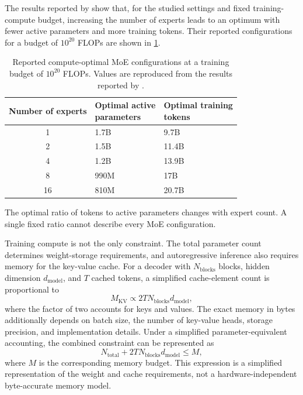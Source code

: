 The results reported by \textcite{Ludziejewski2025JointMoE} show that, for
the studied settings and fixed training-compute budget, increasing the
number of experts leads to an optimum with fewer active parameters and more
training tokens. Their reported configurations for a budget of
\(10^{20}\) FLOPs are shown in \cref{tab:scaling-moe-configurations}.

\begin{table}[htbp]
    \centering
    \caption{Reported compute-optimal MoE configurations at a training
    budget of \(10^{20}\) FLOPs. Values are reproduced from the results
    reported by \textcite{Ludziejewski2025JointMoE}.}
    \label{tab:scaling-moe-configurations}
    \begin{tabularx}{\textwidth}{c>{\centering\arraybackslash}X>{\centering\arraybackslash}X}
        \toprule
        Number of experts & \shortstack{Optimal active\\parameters} & \shortstack{Optimal training\\tokens}\\
        \midrule
        1  & 1.7B  & 9.7B\\
        2  & 1.5B  & 11.4B\\
        4  & 1.2B  & 13.9B\\
        8  & 990M  & 17B\\
        16 & 810M  & 20.7B\\
        \bottomrule
    \end{tabularx}
\end{table}

The optimal ratio of tokens to active parameters changes with expert
count. A single fixed ratio cannot describe every MoE configuration.

Training compute is not the only constraint. The total parameter count
determines weight-storage requirements, and autoregressive inference also
requires memory for the key-value cache. For a decoder with \(N_{\mathrm{blocks}}\)
blocks, hidden dimension \(d_{\mathrm{model}}\), and \(T\) cached tokens, a
simplified cache-element count is proportional to
\begin{equation}
    M_{\mathrm{KV}}
    \propto
    2T N_{\mathrm{blocks}}d_{\mathrm{model}},
    \label{eq:scaling-moe-kv-cache}
\end{equation}
where the factor of two accounts for keys and values. The exact memory in
bytes additionally depends on batch size, the number of key-value heads,
storage precision, and implementation details. Under a simplified
parameter-equivalent accounting, the combined constraint can be represented
as
\begin{equation}
    N_{\mathrm{total}}
    +
    2T N_{\mathrm{blocks}}d_{\mathrm{model}}
    \leq M,
    \label{eq:scaling-moe-memory}
\end{equation}
where \(M\) is the corresponding memory budget. This expression is a
simplified representation of the weight and cache requirements, not a
hardware-independent byte-accurate memory model.

